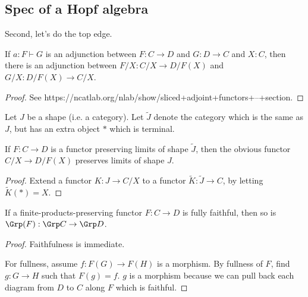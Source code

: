 \subsection{Spec of a Hopf algebra}


Second, let's do the top edge.


\begin{proposition}
  \label{0-slice-adj}
  \uses{}

  If $a : F \vdash G$ is an adjunction between $F : C \to D$ and $G : D \to C$ and $X : C$, then there is an adjunction between $F / X : C / X \to D / F(X)$ and $G / X : D / F(X) \to C / X$.
\end{proposition}
\begin{proof}
  \uses{}

  See https://ncatlab.org/nlab/show/sliced+adjoint+functors+--+section.
\end{proof}


\begin{proposition}
  \label{0-over-lim}
  \uses{}
  \leanok
  Let $J$ be a shape (i.e. a category). Let $\widetilde J$ denote the category which is the same as $J$, but has an extra object $*$ which is terminal.

  If $F : C \to D$ is a functor preserving limits of shape $\widetilde J$, then the obvious functor $C / X \to D / F(X)$ preserves limits of shape $J$.
\end{proposition}
\begin{proof}
  \uses{}
  \leanok

  Extend a functor $K\colon  J \to C / X$ to a functor $\widetilde K\colon \widetilde J \to C$, by letting $\widetilde K (*) = X$.
\end{proof}


\begin{proposition}
  \label{0-full-faithful-grp}
  \uses{}
  \leanok

  If a finite-products-preserving functor $F : C \to D$ is fully faithful, then so is $\Grp(F) : \Grp C \to \Grp D$.
\end{proposition}
\begin{proof}
  \uses{}
  \leanok

  Faithfulness is immediate.

  For fullness, assume $f : F(G) \to F(H)$ is a morphism. By fullness of $F$, find $g : G \to H$ such that $F(g) = f$. $g$ is a morphism because we can pull back each diagram from $D$ to $C$ along $F$ which is faithful.
\end{proof}


